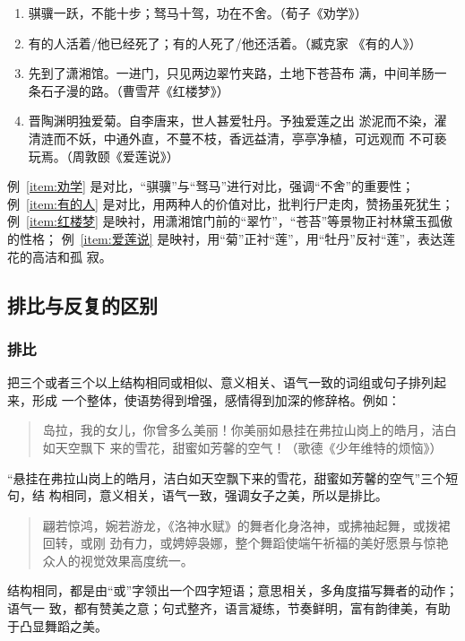 \documentclass[final,oneside]{ctexbook}
\newenvironment{equotation}{\begin{quotation}\kaishu}{\end{quotation}}
\begin{document}
\begin{enumerate}
  \item \label{item:劝学}骐骥一跃，不能十步；驽马十驾，功在不舍。（荀子《劝学》）

  \item \label{item:有的人}有的人活着/他已经死了；有的人死了/他还活着。（臧克家
    《有的人》）

  \item \label{item:红楼梦}先到了潇湘馆。一进门，只见两边翠竹夹路，土地下苍苔布
    满，中间羊肠一条石子漫的路。（曹雪芹《红楼梦》）

  \item \label{item:爱莲说}晋陶渊明独爱菊。自李唐来，世人甚爱牡丹。予独爱莲之出
    淤泥而不染，濯清涟而不妖，中通外直，不蔓不枝，香远益清，亭亭净植，可远观而
    不可亵玩焉。（周敦颐《爱莲说》）
\end{enumerate}

例~\ref{item:劝学} 是对比，“骐骥”与“驽马”进行对比，强调“不舍”的重要性；
例~\ref{item:有的人} 是对比，用两种人的价值对比，批判行尸走肉，赞扬虽死犹生；
例~\ref{item:红楼梦} 是映衬，用潇湘馆门前的“翠竹”，“苍苔”等景物正衬林黛玉孤傲的性格；
例~\ref{item:爱莲说} 是映衬，用“菊”正衬“莲”，用“牡丹”反衬“莲”，表达莲花的高洁和孤
寂。

\subsection{排比与反复的区别}

\subsubsection{排比}

把三个或者三个以上结构相同或相似、意义相关、语气一致的词组或句子排列起来，形成
一个整体，使语势得到增强，感情得到加深的修辞格。例如：
\begin{equotation}
  岛拉，我的女儿，你曾多么美丽！你美丽如悬挂在弗拉山岗上的皓月，洁白如天空飘下
  来的雪花，甜蜜如芳馨的空气！（歌德《少年维特的烦恼》）
\end{equotation}
“悬挂在弗拉山岗上的皓月，洁白如天空飘下来的雪花，甜蜜如芳馨的空气”三个短句，结
构相同，意义相关，语气一致，强调女子之美，所以是排比。

\begin{equotation}
  翩若惊鸿，婉若游龙，《洛神水赋》的舞者化身洛神，或拂袖起舞，或拨裙回转，或刚
  劲有力，或娉婷袅娜，整个舞蹈使端午祈福的美好愿景与惊艳众人的视觉效果高度统一。
\end{equotation}
结构相同，都是由“或”字领出一个四字短语；意思相关，多角度描写舞者的动作；语气一
致，都有赞美之意；句式整齐，语言凝练，节奏鲜明，富有韵律美，有助于凸显舞蹈之美。
\end{document}
